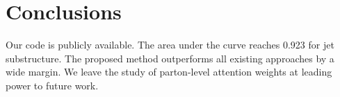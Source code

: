 \section{Conclusions}\label{sec:conclusions}

Our code is publicly available. The area under the curve reaches 0.923
for jet substructure. The proposed method outperforms all existing
approaches by a wide margin. We leave the study of parton-level
attention weights at leading power to future work.

